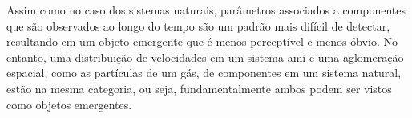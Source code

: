    Assim como no caso dos sistemas naturais, parâmetros associados a componentes que são observados ao longo do tempo são um padrão mais difícil de detectar, resultando em um objeto emergente que é menos perceptível e menos óbvio. No entanto, uma distribuição de velocidades em um sistema \acrshort{ami} e uma aglomeração espacial, como as partículas de um gás, de componentes em um sistema natural, estão na mesma categoria, ou seja, fundamentalmente ambos podem ser vistos como objetos emergentes.
  